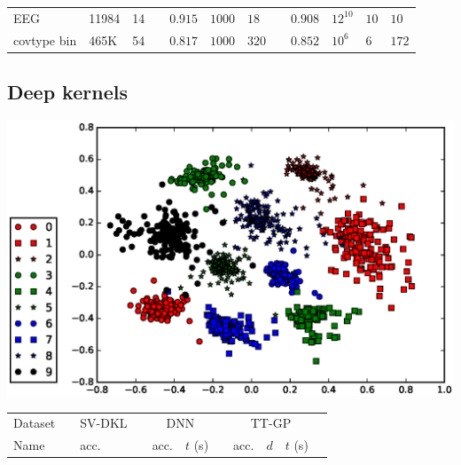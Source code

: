 \documentclass[a0,portrait]{a0poster}
\begin{document}
\begin{multicols}{2}
\begin{center}
\begin{tabular}{lll l cll l clll}
    EEG & 11984 & 14 &&
    $0.915$ & $1000$ & $18$ &&
    $0.908$ & $12^{10}$ & $10$ & $10$\\

    covtype bin & 465K & 54 &&
    $0.817$ & $1000$ & $320$ &&
    $0.852$ & $10^6$ & $6$ & $172$\\
    \bottomrule
  \end{tabular}
\end{center}
\subsection*{\large \color{NavyBlue} Deep kernels}
    
\begin{center}
    \includegraphics[width=20cm]{pics/embed/embedding_2.eps}
\end{center}

\begin{center}
    \label{deep_results}
    \centering
    \begin{tabular}{ll ll llll lll}
      \toprule
      \multicolumn{1}{c}{Dataset}  && SV-DKL &&
      \multicolumn{2}{c}{DNN} &&
      \multicolumn{3}{c}{TT-GP}\\

      \cmidrule{1-1}
      \cmidrule{3-3}
      \cmidrule{5-6}
      \cmidrule{8-10}

      Name &&
      acc. && acc. & $t$ (s) &&
      acc. & $d$ & $t$ (s)
      \\
      \midrule



\end{tabular}
\end{center}
\end{multicols}
\end{document}
